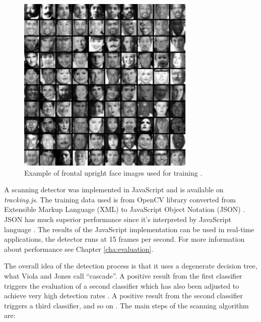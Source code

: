 \begin{figure}[!htb]
  \centering
  \includegraphics[width=240pt]{chapters/tracking_library_for_the_web/viola_training.png}
  \caption{Example of frontal upright face images used for training \cite{Viola2001}.}
  \label{figure:viola_training}
\end{figure}

A scanning detector was implemented in JavaScript \cite{International2009} and is available on \textit{tracking.js}. The training data used is from OpenCV library \cite{Bradski2000} converted from Extensible Markup Language (XML) \cite{Bray2013} to JavaScript Object Notation (JSON) \cite{Crockford2013}. JSON \cite{Crockford2013} has much superior performance since it's interpreted by JavaScript language \cite{International2009,Crockford2013}. The results of the JavaScript \cite{International2009} implementation can be used in real-time applications, the detector runs at 15 frames per second. For more information about performance see Chapter \ref{cha:evaluation}.

The overall idea of the detection process is that it uses a degenerate decision tree, what Viola and Jones \cite{Viola2001} call ``cascade''. A positive result from the first classifier triggers the evaluation of a second classifier which has also been adjusted to achieve very high detection rates \cite{Viola2001}. A positive result from the second classifier triggers a third classifier, and so on \cite{Viola2001}. The main steps of the scanning algorithm are:

